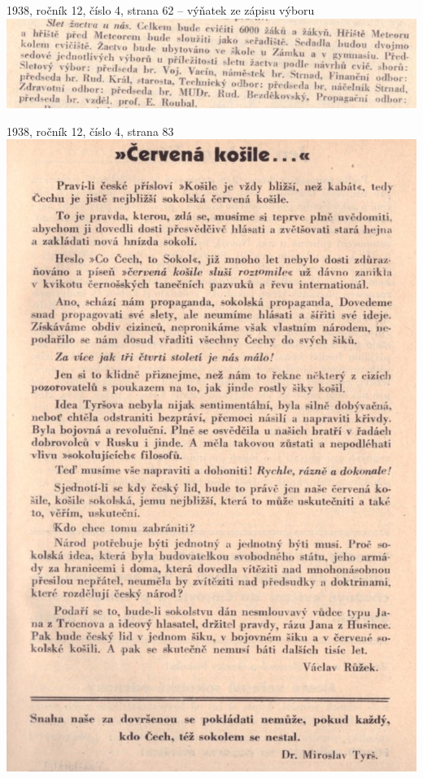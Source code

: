 \documentclass[11pt]{article}
\begin{document}
\vspace*{\baselineskip}
1938, ročník 12, číslo 4, strana 62 -- výňatek ze zápisu výboru \\
\includegraphics[width=\imagewidth]{original/1938/Skener_20250318 (3).jpg}

1938, ročník 12, číslo 4, strana 83 \\
\includegraphics[width=\imagewidth]{original/1938/Skener_20250318 (4).jpg}
\end{document}
